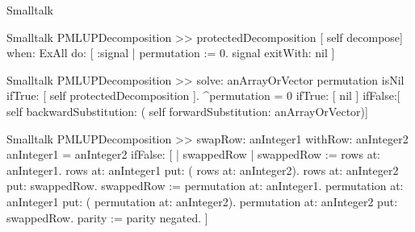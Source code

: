 \begin{displaycode}{Smalltalk}

\begin{displaycode}{Smalltalk}
PMLUPDecomposition >> protectedDecomposition
    [ self decompose] when: ExAll do: [ :signal | permutation := 0. 
                                                signal exitWith: nil ]
\end{displaycode}

\begin{displaycode}{Smalltalk}
PMLUPDecomposition >> solve: anArrayOrVector
    permutation isNil
        ifTrue: [ self protectedDecomposition ].
    ^permutation = 0
        ifTrue: [ nil ]
        ifFalse:[ self backwardSubstitution: ( self 
                                forwardSubstitution: anArrayOrVector)] 
\end{displaycode}

\begin{displaycode}{Smalltalk}
PMLUPDecomposition >> swapRow: anInteger1 withRow: anInteger2
    anInteger1 = anInteger2
        ifFalse: [ | swappedRow |
                  swappedRow := rows at: anInteger1.
                  rows at: anInteger1 put: ( rows at: anInteger2).
                  rows at: anInteger2 put: swappedRow.
                  swappedRow := permutation at: anInteger1.
                  permutation at: anInteger1 put: ( permutation at: 
                                                          anInteger2).
                  permutation at: anInteger2 put: swappedRow.
                  parity := parity negated.
                ]
\end{displaycode}


\end{displaycode}

